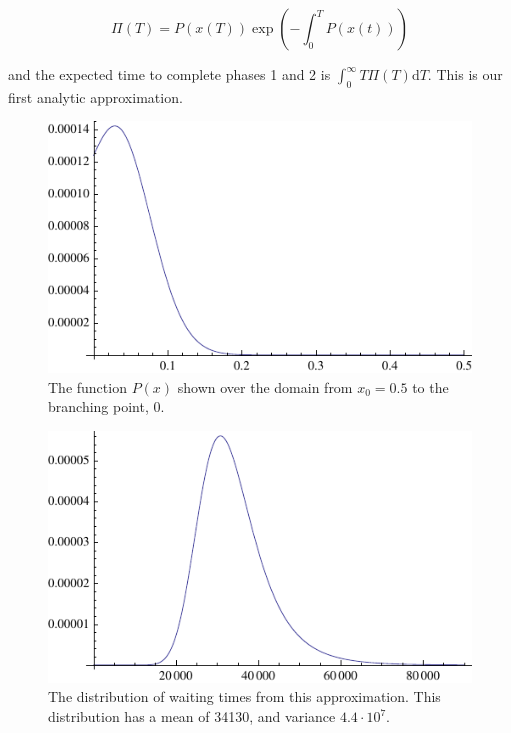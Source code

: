 \documentclass[authoryear,review,11pt]{elsarticle}
\newcommand{\ud}{\mathrm{d}}
\begin{document}
\begin{equation}
\Pi(T) = P(x(T)) \exp\left( -\int_0^T P(x(t)) \right)
\label{pdf}
\end{equation}

and the expected time to complete phases 1 and 2 is $\int_0^{\infty} T \Pi(T) \ud T$. This is our first analytic approximation.  

\begin{figure}
\begin{center}
\includegraphics[width=.9\textwidth]{images/myp}
\caption{The function $P(x)$ shown over the domain from $x_0 = 0.5 $ to the branching point, 0.}
\end{center}
\end{figure}

\begin{figure}
\begin{center}
\includegraphics[width=.9\textwidth]{images/mywaiting}
\caption{The distribution of waiting times from this approximation.  This distribution has a mean of 34130, and variance $4.4\cdot 10^7$.}
\end{center}
\end{figure}
\end{document}
